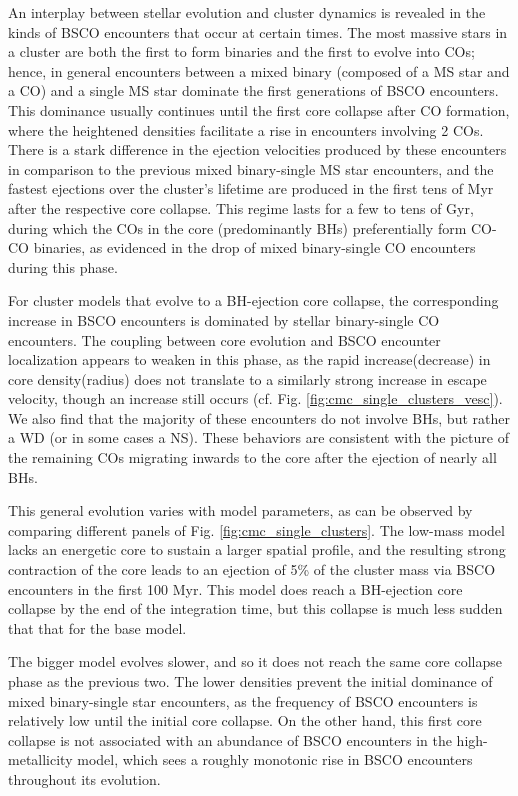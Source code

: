 \documentclass[twocolumn]{aastex631}
\begin{document}
An interplay between stellar evolution and cluster dynamics is revealed in the kinds of BSCO encounters that occur at certain times.
The most massive stars in a cluster are both the first to form binaries and the first to evolve into COs; hence, in general encounters between a mixed binary (composed of a MS star and a CO) and a single MS star dominate the first generations of BSCO encounters.
This dominance usually continues until the first core collapse after CO formation, where the heightened densities facilitate a rise in encounters involving 2 COs.
There is a stark difference in the ejection velocities produced by these encounters in comparison to the previous mixed binary-single MS star encounters, and the fastest ejections over the cluster's lifetime are produced in the first tens of Myr after the respective core collapse.
This regime lasts for a few to tens of Gyr, during which the COs in the core (predominantly BHs) preferentially form CO-CO binaries, as evidenced in the drop of mixed binary-single CO encounters during this phase.

For cluster models that evolve to a BH-ejection core collapse, the corresponding increase in BSCO encounters is dominated by stellar binary-single CO encounters.
The coupling between core evolution and BSCO encounter localization appears to weaken in this phase, as the rapid increase(decrease) in core density(radius) does not translate to a similarly strong increase in escape velocity, though an increase still occurs (cf. Fig. \ref{fig:cmc_single_clusters_vesc}).
We also find that the majority of these encounters do not involve BHs, but rather a WD (or in some cases a NS).
These behaviors are consistent with the picture of the remaining COs migrating inwards to the core after the ejection of nearly all BHs.

This general evolution varies with model parameters, as can be observed by comparing different panels of Fig. \ref{fig:cmc_single_clusters}.
The low-mass model lacks an energetic core to sustain a larger spatial profile, and the resulting strong contraction of the core leads to an ejection of 5\% of the cluster mass via BSCO encounters in the first 100 Myr.
This model does reach a BH-ejection core collapse by the end of the integration time, but this collapse is much less sudden that that for the base model.

The bigger model evolves slower, and so it does not reach the same core collapse phase as the previous two.
The lower densities prevent the initial dominance of mixed binary-single star encounters, as the frequency of BSCO encounters is relatively low until the initial core collapse.
On the other hand, this first core collapse is not associated with an abundance of BSCO encounters in the high-metallicity model, which sees a roughly monotonic rise in BSCO encounters throughout its evolution.
\end{document}
